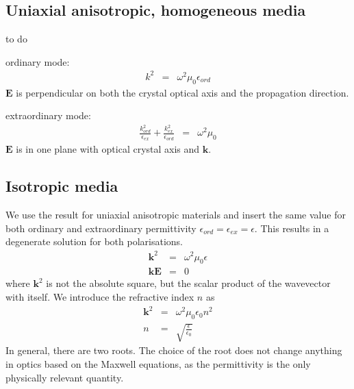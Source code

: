 \documentclass[12pt,a4paper,twoside,openright,BCOR10mm,headsepline,titlepage,abstracton,chapterprefix,final]{scrreprt}
\newcommand\Vector[1]{{\mathbf{#1}}}
\newcommand\vacuum{0}
\newcommand\wavenumber{k}
\newcommand\Wavevector{\Vector{\wavenumber}}
\newcommand\scalarEfield{E}
\newcommand\Efield{\Vector{\scalarEfield}}
\newcommand\vacuumpermeability{\mu_{\vacuum}}
\newcommand\vacuumpermittivity{\epsilon_{\vacuum}}
\newcommand\scalarpermittivity{\epsilon}
\begin{document}
\subsection{Uniaxial anisotropic, homogeneous media}
to do

ordinary mode:
\begin{eqnarray}
 \wavenumber^2 &=& \omega^2 \vacuumpermeability \scalarpermittivity_{ord}
\end{eqnarray}
$\Efield$ is perpendicular on both the crystal optical axis and the propagation direction.

extraordinary mode:
\begin{eqnarray}
  \frac{\wavenumber_{ord}^2 }{\scalarpermittivity_{ex} } + \frac{\wavenumber_{ex}^2 }{\scalarpermittivity_{ord} } &=& \omega^2 \vacuumpermeability
\end{eqnarray}
$\Efield$ is in one plane with optical crystal axis and $\Wavevector$.


\subsection{Isotropic media}

We use the result for uniaxial anisotropic materials and insert the same value for both ordinary and extraordinary permittivity $\scalarpermittivity_{ord} = \scalarpermittivity_{ex} = \scalarpermittivity$.
This results in a degenerate solution for both polarisations.
\begin{eqnarray}
 \Wavevector^2 &=& \omega^2 \vacuumpermeability \scalarpermittivity \\
 \Wavevector \Efield &=& 0
\end{eqnarray}
where $\Wavevector^2$ is not the absolute square, but the scalar product of the wavevector with itself.
We introduce the refractive index $n$ as
\begin{eqnarray}
 \Wavevector^2 &=& \omega^2 \vacuumpermeability \vacuumpermittivity n^2 \\
 n &=& \sqrt{ \frac{\scalarpermittivity}{\vacuumpermittivity} }
\end{eqnarray}
In general, there are two roots. 
The choice of the root does not change anything in optics based on the Maxwell equations, as the permittivity is the only physically relevant quantity.
\end{document}
